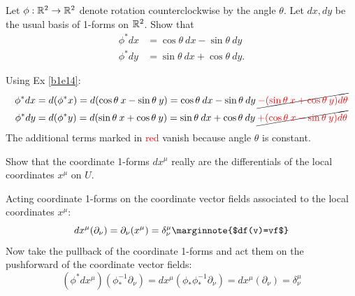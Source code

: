 \documentclass[10pt]{article}
\begin{document}
\begin{example}
	Let $\phi:\mathbb{R}^2\to\mathbb{R}^2$ denote rotation counterclockwise by the angle $\theta$. Let $dx,dy$ be the usual basis of 1-forms on $\mathbb{R}^2$. Show that
	$$
		\begin{aligned}
			\phi^*dx &= \cos\theta\:dx - \sin\theta\:dy\\
			\phi^*dy &= \sin\theta\:dx + \cos\theta\:dy.
		\end{aligned}
	$$
\end{example}
\sol Using Ex \ref{b1e14}:
$$
\begin{aligned}
	\phi^*dx &= d(\phi^*x) = d(\cos\theta\:x-\sin\theta\:y) = \cos\theta\:dx - \sin\theta\:dy \:\cancel{\textcolor{red}{- (\sin\theta\:x + \cos\theta\:y)d\theta}}\\
	\phi^*dy &= d(\phi^*y) = d(\sin\theta\:x+\cos\theta\:y) = \sin\theta\:dx + \cos\theta\:dy \:\cancel{\textcolor{red}{+ (\cos\theta\:x - \sin\theta\:y)d\theta}}
\end{aligned}
$$
The additional terms marked in \textcolor{red}{red} vanish because angle $\theta$ is constant.


\begin{example}
	Show that the coordinate 1-forms $dx^\mu$ really are the differentials of the local coordinates $x^\mu$ on $U$.
\end{example}
\sol Acting coordinate 1-forms on the coordinate vector fields associated to the local coordinates $x^\mu$:
$$dx^\mu(\partial_\nu) = \partial_\nu(x^\mu) = \delta^\mu_\nu\marginnote{$df(v)=vf$}$$
Now take the pullback of the coordinate 1-forms and act them on the pushforward of the coordinate vector fields:
$$(\phi^*dx^\mu)(\phi^{-1}_*\partial_\nu) = dx^\mu(\phi_*\phi^{-1}_*\partial_\nu) = dx^\mu(\partial_\nu)=\delta^\mu_\nu$$
\end{document}
